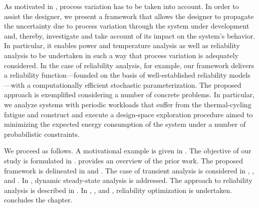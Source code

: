 As motivated in , process variation has to be taken into
account. In order to assist the designer, we present a framework that allows the
designer to propagate the uncertainty due to process variation through the
system under development and, thereby, investigate and take account of its
impact on the system's behavior. In particular, it enables power and temperature
analysis as well as reliability analysis to be undertaken in such a way that
process variation is adequately considered. In the case of reliability analysis,
for example, our framework delivers a reliability function---founded on the
basis of well-established reliability models---with a computationally efficient
stochastic parameterization. The proposed approach is exemplified considering a
number of concrete problems. In particular, we analyze systems with periodic
workloads that suffer from the thermal-cycling fatigue and construct and execute
a design-space exploration procedure aimed to minimizing the expected energy
consumption of the system under a number of probabilistic constraints.

We proceed as follows. A motivational example is given in
. The objective of our study is formulated in
.  provides an overview of the prior work.
The proposed framework is delineated in  and
. The case of transient analysis is considered
in , , and
. In ,
dynamic steady-state analysis is addressed. The approach to reliability analysis
is described in . In
, , and
, reliability optimization is undertaken.
 concludes the chapter.
